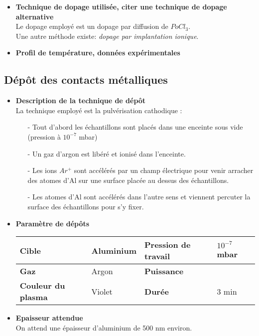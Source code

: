 \documentclass[11pt]{article}
\begin{document}
\begin{itemize}

\item \textbf{Technique de dopage utilis\'ee, citer une technique de dopage alternative }\\
Le dopage employ\'e est un dopage par diffusion de $PoCl_3$. \\ Une autre m\'ethode existe: \textit{dopage par implantation ionique}. 

\item \textbf{Profil de temp\'erature, donn\'ees exp\'erimentales}

\end{itemize}

\subsection{D\'ep\^ot des contacts m\'etalliques}

\begin{itemize}

\item \textbf{Description de la technique de d\'ep\^ot} \\
La technique employ\'e est la pulv\'erisation cathodique :
\begin{itemize} \itemsep -2pt
\item[-] Tout d'abord les \'echantillons sont plac\'es dans une enceinte sous vide (pression \`a $10^{-7}$ mbar)
\item[-] Un gaz d'argon est lib\'er\'e et ionis\'e dans l'enceinte. 
\item[-] Les ions $Ar^{+}$ sont acc\'el\'er\'es par un champ \'electrique pour venir arracher des atomes d'Al sur une surface plac\'ee au dessus des \'echantillons. 
\item[-] Les atomes d'Al sont acc\'el\'er\'es dans l'autre sens et viennent percuter la surface des \'echantillons pour s'y fixer.
\end{itemize}

\clearpage
\item \textbf{Param\`etre de d\'ep\^ots}

    \noindent \begin{tabular}[!htb]{ | p{3.5cm} | p{3.5cm} | p{3.5cm} | p{3.5cm} | }
    \hline
    \textbf{Cible} & Aluminium & \textbf{Pression de travail} & $10^{-7}$ mbar\\ \hline
    \textbf{Gaz} & Argon & \textbf{Puissance} &\\ \hline
    \textbf{Couleur du plasma} & Violet & \textbf{Dur\'ee} & 3 min\\
    \hline
    \end{tabular}

\item \textbf{Epaisseur attendue}\\
    On attend une \'epaisseur d'aluminium de 500 nm environ.
\end{itemize}
\end{document}
